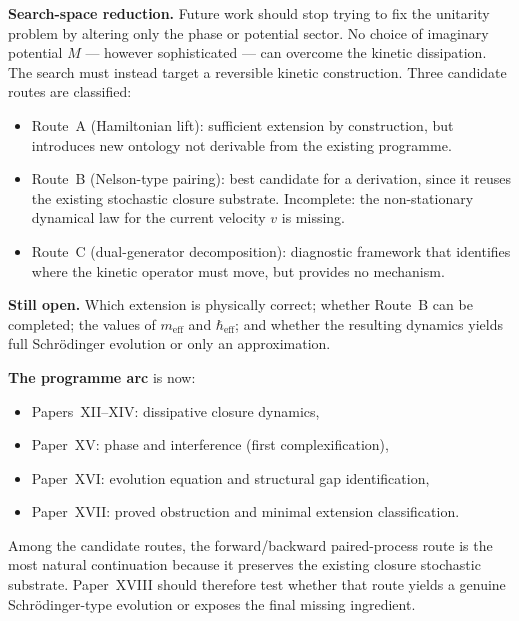 \documentclass[12pt]{article}
\begin{document}
\textbf{Search-space reduction.} Future work should stop trying to fix the unitarity problem by altering only the phase or potential sector. No choice of imaginary potential $M$ --- however sophisticated --- can overcome the kinetic dissipation. The search must instead target a reversible kinetic construction. Three candidate routes are classified:
\begin{itemize}
    \item Route~A (Hamiltonian lift): sufficient extension by construction, but introduces new ontology not derivable from the existing programme.
    \item Route~B (Nelson-type pairing): best candidate for a derivation, since it reuses the existing stochastic closure substrate. Incomplete: the non-stationary dynamical law for the current velocity $v$ is missing.
    \item Route~C (dual-generator decomposition): diagnostic framework that identifies where the kinetic operator must move, but provides no mechanism.
\end{itemize}

\textbf{Still open.} Which extension is physically correct; whether Route~B can be completed; the values of $m_{\mathrm{eff}}$ and $\hbar_{\mathrm{eff}}$; and whether the resulting dynamics yields full Schr\"odinger evolution or only an approximation.

\textbf{The programme arc} is now:
\begin{itemize}
    \item Papers~XII--XIV: dissipative closure dynamics,
    \item Paper~XV: phase and interference (first complexification),
    \item Paper~XVI: evolution equation and structural gap identification,
    \item Paper~XVII: proved obstruction and minimal extension classification.
\end{itemize}

Among the candidate routes, the forward/backward paired-process route is the most natural continuation because it preserves the existing closure stochastic substrate. Paper~XVIII should therefore test whether that route yields a genuine Schr\"odinger-type evolution or exposes the final missing ingredient.



\end{document}
